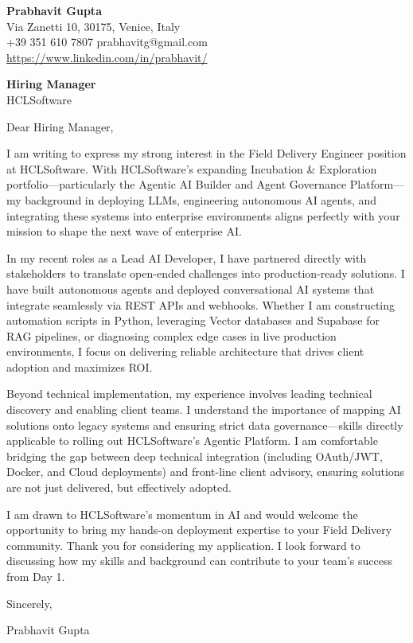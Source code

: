 \documentclass[11pt,a4paper]{article}
\begin{document}
\begin{flushleft}
\textbf{Prabhavit Gupta}\\
Via Zanetti 10, 30175, Venice, Italy\\
+39 351 610 7807 \textbar{} prabhavitg@gmail.com\\
\url{https://www.linkedin.com/in/prabhavit/}
\end{flushleft}

\vspace{1em}

\begin{flushleft}
\textbf{Hiring Manager}\\
HCLSoftware\\
\end{flushleft}

\vspace{1em}

Dear Hiring Manager,

I am writing to express my strong interest in the Field Delivery Engineer position at HCLSoftware. With HCLSoftware's expanding Incubation \& Exploration portfolio---particularly the Agentic AI Builder and Agent Governance Platform---my background in deploying LLMs, engineering autonomous AI agents, and integrating these systems into enterprise environments aligns perfectly with your mission to shape the next wave of enterprise AI.

In my recent roles as a Lead AI Developer, I have partnered directly with stakeholders to translate open-ended challenges into production-ready solutions. I have built autonomous agents and deployed conversational AI systems that integrate seamlessly via REST APIs and webhooks. Whether I am constructing automation scripts in Python, leveraging Vector databases and Supabase for RAG pipelines, or diagnosing complex edge cases in live production environments, I focus on delivering reliable architecture that drives client adoption and maximizes ROI.

Beyond technical implementation, my experience involves leading technical discovery and enabling client teams. I understand the importance of mapping AI solutions onto legacy systems and ensuring strict data governance---skills directly applicable to rolling out HCLSoftware's Agentic Platform. I am comfortable bridging the gap between deep technical integration (including OAuth/JWT, Docker, and Cloud deployments) and front-line client advisory, ensuring solutions are not just delivered, but effectively adopted.

I am drawn to HCLSoftware's momentum in AI and would welcome the opportunity to bring my hands-on deployment expertise to your Field Delivery community. Thank you for considering my application. I look forward to discussing how my skills and background can contribute to your team's success from Day 1.

Sincerely,

\vspace{1em}
Prabhavit Gupta
\end{document}
